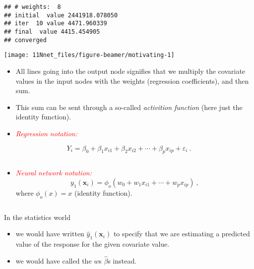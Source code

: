\documentclass[10pt,ignorenonframetext,]{beamer}
\providecommand{\tightlist}{%
  \setlength{\itemsep}{0pt}\setlength{\parskip}{0pt}}
\begin{document}
\begin{frame}[fragile]

\vspace{-20mm}

\scriptsize

\begin{verbatim}
## # weights:  8
## initial  value 2441918.078050 
## iter  10 value 4471.960339
## final  value 4415.454905 
## converged
\end{verbatim}

\begin{center}\texttt{[image: 11Nnet\_files/figure-beamer/motivating-1]} \end{center}

\normalsize

\begin{itemize}
\tightlist
\item
  All lines going into the output node signifies that we multiply the
  covariate values in the input nodes with the weights (regression
  coefficients), and then sum.
\item
  This sum can be sent through a so-called \emph{activition function}
  (here just the identity function).
\end{itemize}

\end{frame}

\begin{frame}

\begin{itemize}
\tightlist
\item
  \emph{\textcolor{red}{Regression notation:}}
\end{itemize}

\begin{equation*}
 Y_i=\beta_0 + \beta_1 x_{i1}+\beta_2 x_{i2}+\cdots + \beta_p x_{ip}+\varepsilon_i \ .
\end{equation*}

\(~\)

\begin{itemize}
\tightlist
\item
  \emph{\textcolor{red}{Neural network notation:}} \begin{equation*}
  y_1({\boldsymbol x}_i)=\phi_o(w_0+w_1 x_{i1}+\cdots + w_p x_{ip}) \ ,
  \end{equation*} where \(\phi_o(x)=x\) (identity function).
\end{itemize}

\(~\)

In the statistics world

\begin{itemize}
\item
  we would have written \(\hat{y}_1({\boldsymbol x}_i)\) to specify that
  we are estimating a predicted value of the response for the given
  covariate value.
\item
  we would have called the \(w\)s \(\hat{\beta}\)s instead.
\end{itemize}

\end{frame}
\end{document}
